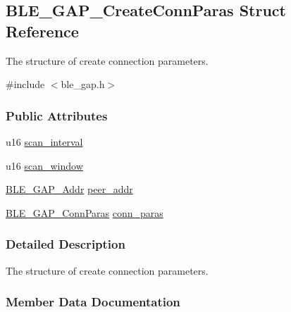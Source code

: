 \hypertarget{struct_b_l_e___g_a_p___create_conn_paras}{}\subsection{B\+L\+E\+\_\+\+G\+A\+P\+\_\+\+Create\+Conn\+Paras Struct Reference}
\label{struct_b_l_e___g_a_p___create_conn_paras}


The structure of create connection parameters.  




{\ttfamily \#include $<$ble\+\_\+gap.\+h$>$}

\subsubsection*{Public Attributes}
\begin{DoxyCompactItemize}
\item 
u16 \hyperlink{struct_b_l_e___g_a_p___create_conn_paras_a648e7f6b9fd6dabb56f4c97cd24c479d}{scan\+\_\+interval}
\item 
u16 \hyperlink{struct_b_l_e___g_a_p___create_conn_paras_a8cd0f27ad3eec63e2843d362296376ce}{scan\+\_\+window}
\item 
\hyperlink{struct_b_l_e___g_a_p___addr}{B\+L\+E\+\_\+\+G\+A\+P\+\_\+\+Addr} \hyperlink{struct_b_l_e___g_a_p___create_conn_paras_a7f70bde07a4103c46219c58ef1cf0b6b}{peer\+\_\+addr}
\item 
\hyperlink{struct_b_l_e___g_a_p___conn_paras}{B\+L\+E\+\_\+\+G\+A\+P\+\_\+\+Conn\+Paras} \hyperlink{struct_b_l_e___g_a_p___create_conn_paras_acc5c850a5211d2db3533ceb41e076c22}{conn\+\_\+paras}
\end{DoxyCompactItemize}


\subsubsection{Detailed Description}
The structure of create connection parameters. 

\subsubsection{Member Data Documentation}
